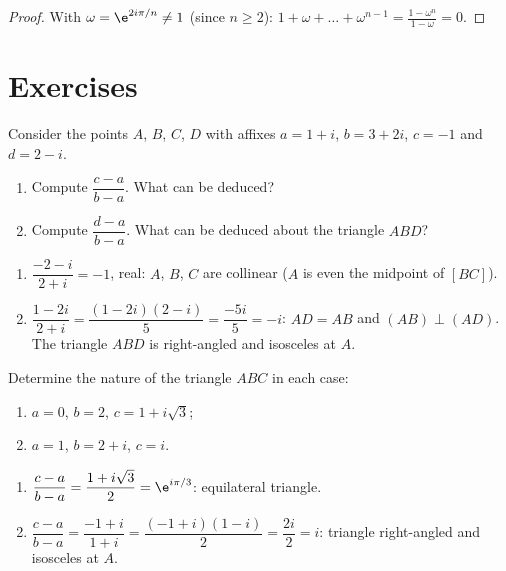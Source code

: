 \begin{proof}
With $\omega=\e^{2i\pi/n}\neq1$ (since $n\ge2$): $1+\omega+\dots+\omega^{n-1}=\frac{1-\omega^n}{1-\omega}=0$.
\end{proof}
\begin{figurebox}
\end{figurebox}

\mxnewpage
\section{Exercises}
\begin{exercise}
Consider the points $A$, $B$, $C$, $D$ with affixes $a=1+i$, $b=3+2i$, $c=-1$ and $d=2-i$.
\begin{enumerate}
\item Compute $\dfrac{c-a}{b-a}$. What can be deduced?
\item Compute $\dfrac{d-a}{b-a}$. What can be deduced about the triangle $ABD$?
\end{enumerate}
\end{exercise}
\begin{solution}
\begin{enumerate}
\item $\dfrac{-2-i}{2+i}=-1$, real: $A$, $B$, $C$ are collinear ($A$ is even the midpoint of $[BC]$).
\item $\dfrac{1-2i}{2+i}=\dfrac{(1-2i)(2-i)}5=\dfrac{-5i}5=-i$: $AD=AB$ and $(AB)\perp(AD)$. The triangle $ABD$ is right-angled and isosceles at $A$.
\end{enumerate}
\end{solution}

\begin{exercise}
Determine the nature of the triangle $ABC$ in each case:
\begin{enumerate}
\item $a=0$, $b=2$, $c=1+i\sqrt3$;
\item $a=1$, $b=2+i$, $c=i$.
\end{enumerate}
\end{exercise}
\begin{solution}
\begin{enumerate}
\item $\dfrac{c-a}{b-a}=\dfrac{1+i\sqrt3}2=\e^{i\pi/3}$: equilateral triangle.
\item $\dfrac{c-a}{b-a}=\dfrac{-1+i}{1+i}=\dfrac{(-1+i)(1-i)}2=\dfrac{2i}{2}=i$: triangle right-angled and isosceles at $A$.
\end{enumerate}
\end{solution}

